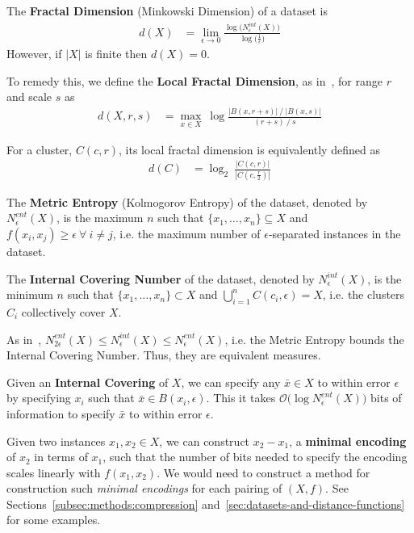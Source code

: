 The \textbf{Fractal Dimension} (Minkowski Dimension) of a dataset is
\begin{align*}
    d(X) &= \lim_{\epsilon \rightarrow 0} \frac{\log \big( N_{\epsilon}^{int}(X) \big) }{\log \big( \frac{1}{\epsilon} \big)}
\end{align*}
However, if $|X|$ is finite then $d(X) = 0$.

To remedy this, we define the \textbf{Local Fractal Dimension}, as in~\cite{berger2020levenshtein}, for range $r$ and scale $s$ as
\begin{align*}
    d(X, r, s) &= \max_{x \in X} \ \log \frac{|B(x, r + s)| \ / \ |B(x, s)|}{(r + s) \ / \ s}
\end{align*}

For a cluster, $C(c, r)$, its local fractal dimension is equivalently defined as
\begin{align}
    \label{eq:local-fractal-dimension}
    d(C) &= \log_2 \ \frac{|C(c, r)|}{|C(c, \frac{r}{2})|}
\end{align}

The \textbf{Metric Entropy} (Kolmogorov Entropy) of the dataset, denoted by $N_{\epsilon}^{ent}(X)$, is the maximum $n$ such that $\{x_1, \dots, x_n\} \subseteq X$ and $f(x_i, x_j) \geq \epsilon \ \forall \ i \neq j$, i.e. the maximum number of $\epsilon$-separated instances in the dataset.

The \textbf{Internal Covering Number} of the dataset, denoted by $N_{\epsilon}^{int}(X)$, is the minimum $n$ such that $\{x_1, \dots, x_n\} \subset X$ and $\bigcup_{i = 1}^{n} C(c_i, \epsilon) = X$, i.e. the clusters $C_i$ collectively cover $X$.

As in~\cite{berger2020levenshtein}, $N_{2\epsilon}^{ent}(X) \leq N_{\epsilon}^{int}(X) \leq N_{\epsilon}^{ent}(X)$, i.e. the Metric Entropy bounds the Internal Covering Number.
Thus, they are equivalent measures.

Given an \textbf{Internal Covering} of $X$, we can specify any $\bar{x} \in X$ to within error $\epsilon$ by specifying $x_i$ such that $\bar{x} \in B(x_i, \epsilon)$.
This it takes $\mathcal{O} \big( \log N_{\epsilon}^{ent}(X) \big)$ bits of information to specify $\bar{x}$ to within error $\epsilon$.

Given two instances $x_1, x_2 \in X$, we can construct $x_2 - x_1$, a \textbf{minimal encoding} of $x_2$ in terms of $x_1$, such that the number of bits needed to specify the encoding scales linearly with $f(x_1, x_2)$.
We would need to construct a method for construction such \textit{minimal encodings} for each pairing of $(X, f)$.
See Sections~\ref{subsec:methods:compression} and~\ref{sec:datasets-and-distance-functions} for some examples.

